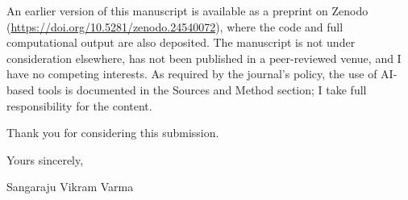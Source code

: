 \documentclass[11pt]{article}
\begin{document}
An earlier version of this manuscript is available as a preprint on Zenodo (\url{https://doi.org/10.5281/zenodo.24540072}), where the code and full computational output are also deposited. The manuscript is not under consideration elsewhere, has not been published in a peer-reviewed venue, and I have no competing interests. As required by the journal's policy, the use of AI-based tools is documented in the Sources and Method section; I take full responsibility for the content.

Thank you for considering this submission.

Yours sincerely,

Sangaraju Vikram Varma\\
\end{document}
